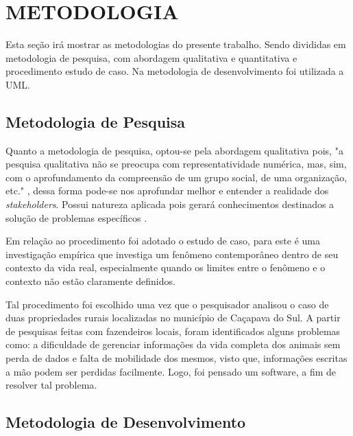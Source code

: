 %
%



\section{METODOLOGIA}\label{chap:metodologia}

Esta seção irá mostrar as metodologias do presente trabalho. Sendo divididas em metodologia de pesquisa, com abordagem qualitativa e quantitativa e procedimento estudo de caso. Na metodologia de desenvolvimento foi utilizada a UML.

\subsection{\textbf{Metodologia de Pesquisa}}

Quanto a metodologia de pesquisa, optou-se pela abordagem qualitativa pois, "a pesquisa qualitativa não se preocupa com representatividade numérica, mas, sim, com o aprofundamento da compreensão de um grupo social, de uma organização, etc."  \cite{ufrgs09}, dessa forma pode-se nos aprofundar melhor e entender a realidade dos \emph{stakeholders}. Possui natureza aplicada pois gerará conhecimentos destinados a solução de problemas específicos \cite{ufrgs09} .

Em relação ao procedimento foi adotado o estudo de caso, para  este é uma investigação empírica que investiga um fenômeno contemporâneo dentro de seu contexto da vida real, especialmente quando os limites entre o fenômeno e o contexto não estão claramente definidos.

Tal procedimento foi  escolhido uma vez que o pesquisador analisou o caso de duas propriedades rurais localizadas no município de Caçapava do Sul. A partir de pesquisas  feitas com fazendeiros locais, foram identificados alguns problemas como: a dificuldade de gerenciar informações da vida completa dos animais sem perda de  dados e falta de mobilidade dos mesmos, visto que, informações escritas a mão podem ser perdidas facilmente. Logo, foi pensado um software, a fim de resolver tal problema.

\subsection{\textbf{Metodologia de Desenvolvimento}}

